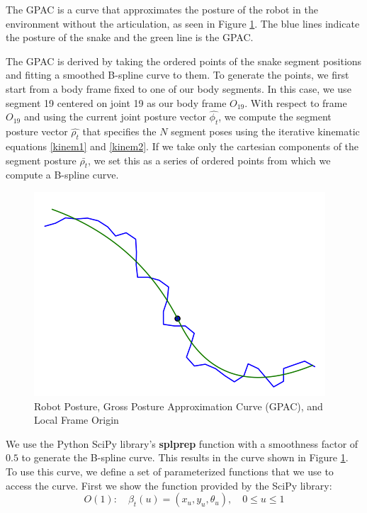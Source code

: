 The GPAC is a curve that approximates the posture of the robot in the environment without the articulation, as seen in Figure \ref{GPAC}.  The blue lines indicate the posture of the snake and the green line is the GPAC.

The GPAC is derived by taking the ordered points of the snake segment positions and fitting a smoothed B-spline curve to them.  To generate the points, we first start from a body frame fixed to one of our body segments.  In this case, we use segment 19 centered on joint 19 as our body frame $O_{19}$.  With respect to frame $O_{19}$ and using the current joint posture vector $\hat{\phi_t}$, we compute the segment posture vector $\hat{\rho_t}$ that specifies the $N$ segment poses using the iterative kinematic equations \ref{kinem1} and \ref{kinem2}.  If we take only the cartesian components of the segment posture $\bar{\rho_t}$, we set this as a series of ordered points from which we compute a B-spline curve.


\begin{figure}
  \begin{center}
    \includegraphics[scale=0.7]{plotGPAC0059.png}
  \end{center}
  \caption{Robot Posture, Gross Posture Approximation Curve (GPAC), and Local Frame Origin}
	\label{GPAC}
\end{figure}

We use the Python SciPy library's \textbf{splprep} function with a smoothness factor of $0.5$ to generate the B-spline curve.  This results in the curve shown in Figure \ref{GPAC}.  To use this curve, we define a set of parameterized functions that we use to access the curve.  First we show the function provided by the SciPy library:
\begin{equation}
O(1): \quad \beta_t(u) = ( x_u, y_u, \theta_u ),  \quad 0 \leq u \leq 1
\end{equation}


